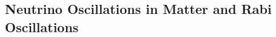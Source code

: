 %
%
%
%
%
%
%
%
%
%
%
%
%
%
%


\subsection{Neutrino Oscillations in Matter and Rabi Oscillations}

